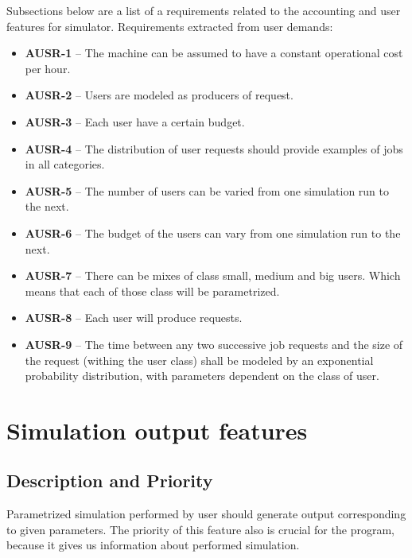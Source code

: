 \documentclass{report}
\begin{document}
Subsections below are a list of a requirements related to the accounting and user features for simulator.
Requirements extracted from user demands:
\begin{itemize}
	\item
	{
		\textbf{AUSR-1} -- The machine can be assumed to have a constant operational cost per hour.
	}
	\item
	{
		\textbf{AUSR-2} -- Users are modeled as producers of request.
	}
	\item
	{
		\textbf{AUSR-3} -- Each user have a certain budget.
	}
	\item
	{
		\textbf{AUSR-4} -- The distribution of user requests should provide examples of jobs in all categories.
	}
	\item
	{
		\textbf{AUSR-5} -- The number of users can be varied from one simulation run to the next.
	}
	\item
	{
		\textbf{AUSR-6} -- The budget of the users can vary from one simulation run to the next.
	}
	\item
	{
		\textbf{AUSR-7} -- There can be mixes of class small, medium and big users. Which means that each of those class will be parametrized. 
	}
	\item
	{
		\textbf{AUSR-8} -- Each user will produce requests. 
	}
	\item
	{
		\textbf{AUSR-9} -- The time between any two successive job requests and the size of the request (withing the user class) shall be modeled by an exponential probability distribution, with parameters dependent on the class of user.
	}
\end{itemize}



\section{Simulation output features}

\subsection{Description and Priority}
Parametrized simulation performed by user should generate output corresponding to given parameters. The priority of this feature also is crucial for the program, because it gives us information about performed simulation.
\end{document}
